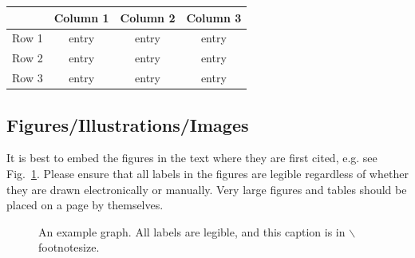 \documentclass{evolang}
\begin{document}
\begin{table}[ht]
{\footnotesize
\begin{tabular}{@{}cccc@{}}
\hline
 & Column 1 & Column 2 & Column 3\\
\hline
Row 1 & entry & entry & entry \\
Row 2 & entry & entry & entry \\
Row 3 & entry & entry & entry \\

\hline
\end{tabular}\label{table1}}
\end{table}


\subsection{Figures/Illustrations/Images}

It is best to embed the figures in the text where they are first cited,
e.g. see Fig.~\ref{inter}. Please ensure that all labels in the
figures are legible regardless of whether they are drawn electronically or manually.  Very large figures and tables should be placed
on a page by themselves.


\begin{figure}[ht]
\begin{center}
\end{center}
\caption{{\footnotesize An example graph.  All labels are legible, and
    this caption is in $\backslash$footnotesize. \label{inter}}}
\end{figure}
\end{document}
